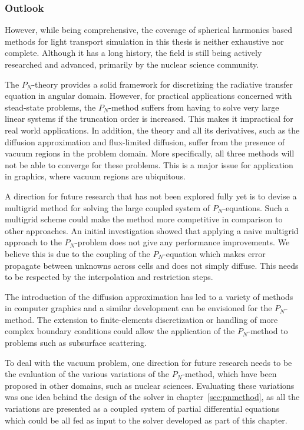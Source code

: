 \subsubsection*{Outlook}

However, while being comprehensive, the coverage of spherical harmonics based methods for light transport simulation in this thesis is neither exhaustive nor complete. Although it has a long history, the field is still being actively researched and advanced, primarily by the nuclear science community.

The $P_N$-theory provides a solid framework for discretizing the radiative transfer equation in angular domain. However, for practical applications concerned with stead-state problems, the $P_N$-method suffers from having to solve very large linear systems if the truncation order is increased. This makes it impractical for real world applications. In addition, the theory and all its derivatives, such as the diffusion approximation and flux-limited diffusion, suffer from the presence of vacuum regions in the problem domain. More specifically, all three methods will not be able to converge for these problems. This is a major issue for application in graphics, where vacuum regions are ubiquitous.

A direction for future research that has not been explored fully yet is to devise a multigrid method for solving the large coupled system of $P_N$-equations. Such a multigrid scheme could make the method more competitive in comparison to other approaches. An initial investigation showed that applying a naive multigrid approach to the $P_N$-problem does not give any performance improvements. We believe this is due to the coupling of the $P_N$-equation which makes error propagate between unknowns across cells and does not simply diffuse. This needs to be respected by the interpolation and restriction steps.

The introduction of the diffusion approximation has led to a variety of methods in computer graphics and a similar development can be envisioned for the $P_N$-method. The extension to finite-elements discretization or handling of more complex boundary conditions could allow the application of the $P_N$-method to problems such as subsurface scattering.

To deal with the vacuum problem, one direction for future research needs to be the evaluation of the various variations of the $P_N$-method, which have been proposed in other domains, such as nuclear sciences. Evaluating these variations was one idea behind the design of the solver in chapter~\ref{sec:pnmethod}, as all the variations are presented as a coupled system of partial differential equations which could be all fed as input to the solver developed as part of this chapter.

